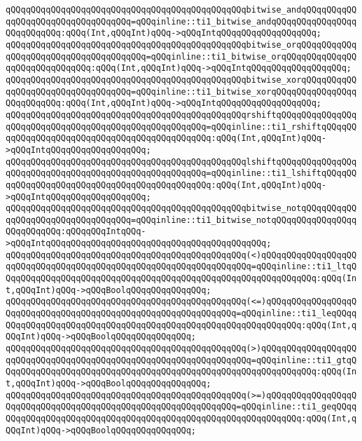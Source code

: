 \verb|qQQqqQQqqQQqqQQqqQQqqQQqqQQqqQQqqQQqqQQqqQQqqQQqbitwise_andqQQqqQQqqQQqqQQqqQQqqQQqqQQqqQQqqQQq=qQQqinline::ti1_bitwise_andqQQqqQQqqQQqqQQqqQQqqQQqqQQq:qQQq(Int,qQQqInt)qQQq->qQQqIntqQQqqQQqqQQqqQQqqQQq;|\newline
\verb|qQQqqQQqqQQqqQQqqQQqqQQqqQQqqQQqqQQqqQQqqQQqqQQqbitwise_orqQQqqQQqqQQqqQQqqQQqqQQqqQQqqQQqqQQqqQQq=qQQqinline::ti1_bitwise_orqQQqqQQqqQQqqQQqqQQqqQQqqQQqqQQq:qQQq(Int,qQQqInt)qQQq->qQQqIntqQQqqQQqqQQqqQQqqQQq;|\newline
\verb|qQQqqQQqqQQqqQQqqQQqqQQqqQQqqQQqqQQqqQQqqQQqqQQqbitwise_xorqQQqqQQqqQQqqQQqqQQqqQQqqQQqqQQqqQQq=qQQqinline::ti1_bitwise_xorqQQqqQQqqQQqqQQqqQQqqQQqqQQq:qQQq(Int,qQQqInt)qQQq->qQQqIntqQQqqQQqqQQqqQQqqQQq;|\newline
\verb|qQQqqQQqqQQqqQQqqQQqqQQqqQQqqQQqqQQqqQQqqQQqqQQqrshiftqQQqqQQqqQQqqQQqqQQqqQQqqQQqqQQqqQQqqQQqqQQqqQQqqQQqqQQq=qQQqinline::ti1_rshiftqQQqqQQqqQQqqQQqqQQqqQQqqQQqqQQqqQQqqQQqqQQqqQQq:qQQq(Int,qQQqInt)qQQq->qQQqIntqQQqqQQqqQQqqQQqqQQq;|\newline
\verb|qQQqqQQqqQQqqQQqqQQqqQQqqQQqqQQqqQQqqQQqqQQqqQQqlshiftqQQqqQQqqQQqqQQqqQQqqQQqqQQqqQQqqQQqqQQqqQQqqQQqqQQqqQQq=qQQqinline::ti1_lshiftqQQqqQQqqQQqqQQqqQQqqQQqqQQqqQQqqQQqqQQqqQQqqQQq:qQQq(Int,qQQqInt)qQQq->qQQqIntqQQqqQQqqQQqqQQqqQQq;|\newline
\verb|qQQqqQQqqQQqqQQqqQQqqQQqqQQqqQQqqQQqqQQqqQQqqQQqbitwise_notqQQqqQQqqQQqqQQqqQQqqQQqqQQqqQQqqQQq=qQQqinline::ti1_bitwise_notqQQqqQQqqQQqqQQqqQQqqQQqqQQq:qQQqqQQqIntqQQq->qQQqIntqQQqqQQqqQQqqQQqqQQqqQQqqQQqqQQqqQQqqQQqqQQq;|\newline
\verb|qQQqqQQqqQQqqQQqqQQqqQQqqQQqqQQqqQQqqQQqqQQqqQQq(<)qQQqqQQqqQQqqQQqqQQqqQQqqQQqqQQqqQQqqQQqqQQqqQQqqQQqqQQqqQQqqQQqqQQq=qQQqinline::ti1_ltqQQqqQQqqQQqqQQqqQQqqQQqqQQqqQQqqQQqqQQqqQQqqQQqqQQqqQQqqQQqqQQq:qQQq(Int,qQQqInt)qQQq->qQQqBoolqQQqqQQqqQQqqQQq;|\newline
\verb|qQQqqQQqqQQqqQQqqQQqqQQqqQQqqQQqqQQqqQQqqQQqqQQq(<=)qQQqqQQqqQQqqQQqqQQqqQQqqQQqqQQqqQQqqQQqqQQqqQQqqQQqqQQqqQQqqQQq=qQQqinline::ti1_leqQQqqQQqqQQqqQQqqQQqqQQqqQQqqQQqqQQqqQQqqQQqqQQqqQQqqQQqqQQqqQQq:qQQq(Int,qQQqInt)qQQq->qQQqBoolqQQqqQQqqQQqqQQq;|\newline
\verb|qQQqqQQqqQQqqQQqqQQqqQQqqQQqqQQqqQQqqQQqqQQqqQQq(>)qQQqqQQqqQQqqQQqqQQqqQQqqQQqqQQqqQQqqQQqqQQqqQQqqQQqqQQqqQQqqQQqqQQq=qQQqinline::ti1_gtqQQqqQQqqQQqqQQqqQQqqQQqqQQqqQQqqQQqqQQqqQQqqQQqqQQqqQQqqQQqqQQq:qQQq(Int,qQQqInt)qQQq->qQQqBoolqQQqqQQqqQQqqQQq;|\newline
\verb|qQQqqQQqqQQqqQQqqQQqqQQqqQQqqQQqqQQqqQQqqQQqqQQq(>=)qQQqqQQqqQQqqQQqqQQqqQQqqQQqqQQqqQQqqQQqqQQqqQQqqQQqqQQqqQQqqQQq=qQQqinline::ti1_geqQQqqQQqqQQqqQQqqQQqqQQqqQQqqQQqqQQqqQQqqQQqqQQqqQQqqQQqqQQqqQQq:qQQq(Int,qQQqInt)qQQq->qQQqBoolqQQqqQQqqQQqqQQq;|\newline
